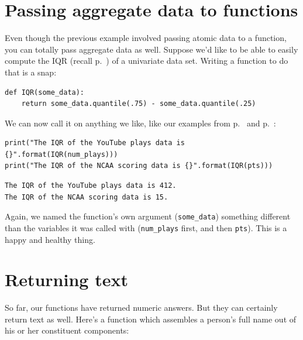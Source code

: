\section{Passing aggregate data to functions}


Even though the previous example involved passing atomic data to a function,
you can totally pass aggregate data as well. Suppose we'd like to be able to
easily compute the IQR (recall p.~\pageref{IQR}) of a univariate data set.
Writing a function to do that is a snap:

\begin{Verbatim}[fontsize=\footnotesize,samepage=true,frame=single,framesep=3mm]
def IQR(some_data):
    return some_data.quantile(.75) - some_data.quantile(.25)
\end{Verbatim}

We can now call it on anything we like, like our examples from
p.~\pageref{YouTubeData} and p.~\pageref{NCAAData}:

\begin{Verbatim}[fontsize=\CBCodeSmall,samepage=true,frame=single,framesep=3mm]
print("The IQR of the YouTube plays data is {}".format(IQR(num_plays)))
print("The IQR of the NCAA scoring data is {}".format(IQR(pts)))
\end{Verbatim}
\vspace{-.2in}

\begin{Verbatim}[fontsize=\small,samepage=true,frame=leftline,framesep=5mm,framerule=1mm]
The IQR of the YouTube plays data is 412.
The IQR of the NCAA scoring data is 15.
\end{Verbatim}

Again, we named the function's own argument (\texttt{some\_data}) something
different than the variables it was called with (\texttt{num\_plays} first, and
then \texttt{pts}). This is a happy and healthy thing.

\section{Returning text}

So far, our functions have returned numeric answers. But they can certainly
return text as well. Here's a function which assembles a person's full name out
of his or her constituent components:

